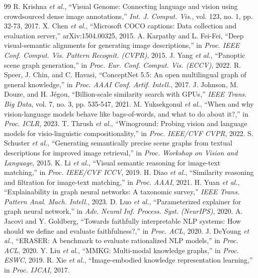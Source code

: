 \documentclass[conference]{IEEEtran}
\begin{document}
\begin{thebibliography}{99}
 R. Krishna \emph{et al.}, ``Visual Genome: Connecting language and vision using crowdsourced dense image annotations,'' \emph{Int. J. Comput. Vis.}, vol. 123, no. 1, pp. 32-73, 2017.
 X. Chen \emph{et al.}, ``Microsoft COCO captions: Data collection and evaluation server,'' arXiv:1504.00325, 2015.
 A. Karpathy and L. Fei-Fei, ``Deep visual-semantic alignments for generating image descriptions,'' in \emph{Proc. IEEE Conf. Comput. Vis. Pattern Recognit. (CVPR)}, 2015.
 J. Yang \emph{et al.}, ``Panoptic scene graph generation,'' in \emph{Proc. Eur. Conf. Comput. Vis. (ECCV)}, 2022.
 R. Speer, J. Chin, and C. Havasi, ``ConceptNet 5.5: An open multilingual graph of general knowledge,'' in \emph{Proc. AAAI Conf. Artif. Intell.}, 2017.
 J. Johnson, M. Douze, and H. J\'{e}gou, ``Billion-scale similarity search with GPUs,'' \emph{IEEE Trans. Big Data}, vol. 7, no. 3, pp. 535-547, 2021.
 M. Yuksekgonul \emph{et al.}, ``When and why vision-language models behave like bags-of-words, and what to do about it?,'' in \emph{Proc. ICLR}, 2023.
 T. Thrush \emph{et al.}, ``Winoground: Probing vision and language models for visio-linguistic compositionality,'' in \emph{Proc. IEEE/CVF CVPR}, 2022.
 S. Schuster \emph{et al.}, ``Generating semantically precise scene graphs from textual descriptions for improved image retrieval,'' in \emph{Proc. Workshop on Vision and Language}, 2015.
 K. Li \emph{et al.}, ``Visual semantic reasoning for image-text matching,'' in \emph{Proc. IEEE/CVF ICCV}, 2019.
 H. Diao \emph{et al.}, ``Similarity reasoning and filtration for image-text matching,'' in \emph{Proc. AAAI}, 2021.
 H. Yuan \emph{et al.}, ``Explainability in graph neural networks: A taxonomic survey,'' \emph{IEEE Trans. Pattern Anal. Mach. Intell.}, 2023.
 D. Luo \emph{et al.}, ``Parameterized explainer for graph neural network,'' in \emph{Adv. Neural Inf. Process. Syst. (NeurIPS)}, 2020.
 A. Jacovi and Y. Goldberg, ``Towards faithfully interpretable NLP systems: How should we define and evaluate faithfulness?,'' in \emph{Proc. ACL}, 2020.
 J. DeYoung \emph{et al.}, ``ERASER: A benchmark to evaluate rationalized NLP models,'' in \emph{Proc. ACL}, 2020.
 Y. Liu \emph{et al.}, ``MMKG: Multi-modal knowledge graphs,'' in \emph{Proc. ESWC}, 2019.
 R. Xie \emph{et al.}, ``Image-embodied knowledge representation learning,'' in \emph{Proc. IJCAI}, 2017.
\end{thebibliography}
\end{document}
